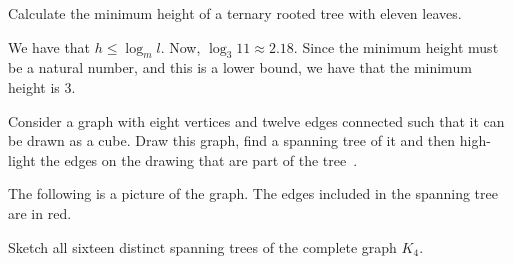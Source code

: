 \documentclass[a4paper, 12pt]{exam}
\begin{document}
\begin{questions}
\question
  Calculate the minimum height of a ternary rooted tree with eleven leaves.

  \begin{solution}
    We have that $h \leq  \log_m l$.
    Now, $\log_3 11 \approx 2.18$.
    Since the minimum height must be a natural number, and this is a lower bound, we have that the minimum height is 3.
  \end{solution}


\question
  Consider a graph with eight vertices and twelve edges connected such that it can be drawn as a cube.
  Draw this graph, find a spanning tree of it and then high-light the edges on the drawing that are part of the tree~\cite{biggs02}.

  \begin{solution}
    The following is a picture of the graph.
    The edges included in the spanning tree are in red.
    \begin{center}
  	 \begin{adjustbox}{max width=0.6\textwidth}
			\end{adjustbox}
		\end{center}
  \end{solution}

\question
  Sketch all sixteen distinct spanning trees of the complete graph $K_4$.


\end{questions}
\end{document}
